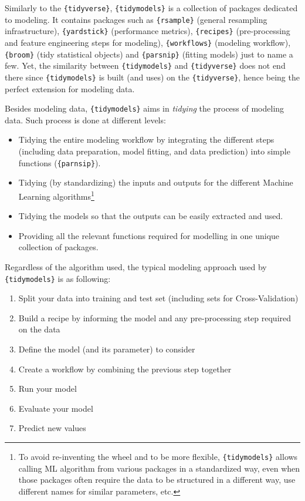 \documentclass[
]{krantz}
\providecommand{\tightlist}{%
  \setlength{\itemsep}{0pt}\setlength{\parskip}{0pt}}
\begin{document}
Similarly to the \texttt{\{tidyverse\}}, \texttt{\{tidymodels\}} is a collection of packages dedicated to modeling. It contains packages such as \texttt{\{rsample\}} (general resampling infrastructure), \texttt{\{yardstick\}} (performance metrics), \texttt{\{recipes\}} (pre-processing and feature engineering steps for modeling), \texttt{\{workflows\}} (modeling workflow), \texttt{\{broom\}} (tidy statistical objects) and \texttt{\{parsnip\}} (fitting models) just to name a few. Yet, the similarity between \texttt{\{tidymodels\}} and \texttt{\{tidyverse\}} does not end there since \texttt{\{tidymodels\}} is built (and uses) on the \texttt{\{tidyverse\}}, hence being the perfect extension for modeling data.

Besides modeling data, \texttt{\{tidymodels\}} aims in \emph{tidying} the process of modeling data. Such process is done at different levels:

\begin{itemize}
\tightlist
\item
  Tidying the entire modeling workflow by integrating the different steps (including data preparation, model fitting, and data prediction) into simple functions (\texttt{\{parnsip\}}).
\item
  Tidying (by standardizing) the inputs and outputs for the different Machine Learning algorithms\footnote{To avoid re-inventing the wheel and to be more flexible, \texttt{\{tidymodels\}} allows calling ML algorithm from various packages in a standardized way, even when those packages often require the data to be structured in a different way, use different names for similar parameters, etc.}
\item
  Tidying the models so that the outputs can be easily extracted and used.
\item
  Providing all the relevant functions required for modelling in one unique collection of packages.
\end{itemize}

Regardless of the algorithm used, the typical modeling approach used by \texttt{\{tidymodels\}} is as following:

\begin{enumerate}
\def\labelenumi{\arabic{enumi}.}
\tightlist
\item
  Split your data into training and test set (including sets for Cross-Validation)
\item
  Build a recipe by informing the model and any pre-processing step required on the data
\item
  Define the model (and its parameter) to consider
\item
  Create a workflow by combining the previous step together
\item
  Run your model
\item
  Evaluate your model
\item
  Predict new values
\end{enumerate}
\end{document}
